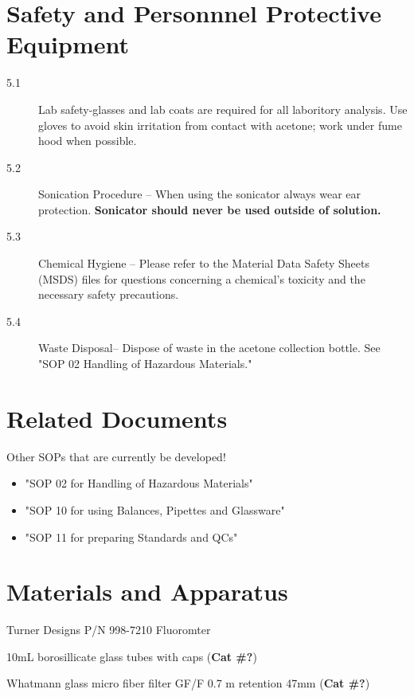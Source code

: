 \documentclass[12pt]{../SOP2}
\begin{document}
\section{Safety and Personnnel Protective Equipment}
\begin{description}
\item[5.1] Lab safety-glasses and lab coats are required for all laboritory analysis. Use gloves to avoid skin irritation from contact with acetone; work under fume hood when possible. 
\item[5.2] Sonication Procedure -- When using the sonicator always wear ear protection. \textbf {Sonicator should never be used outside of solution.}
\item[5.3] Chemical Hygiene -- Please refer to the Material Data Safety Sheets (MSDS) files for questions concerning a chemical's toxicity and the necessary safety precautions.
\item[5.4] Waste Disposal-- Dispose of waste in the acetone collection bottle. See "SOP 02 Handling of Hazardous Materials." %
\end{description}

\section{Related Documents}

Other SOPs that are currently be developed!

\begin{itemize}
%
\item "SOP 02 for Handling of Hazardous Materials"
\item "SOP 10 for using Balances, Pipettes and Glassware"
\item "SOP 11 for preparing Standards and QCs" %
\end{itemize}

\section{Materials and Apparatus}
\NP Turner Designs P/N 998-7210 Fluoromter

\NP 10mL borosillicate glass tubes with caps (\textbf{Cat \#?})

\NP Whatmann glass micro fiber filter GF/F 0.7 \micro m retention 47mm (\textbf{Cat \#?})
\end{document}
